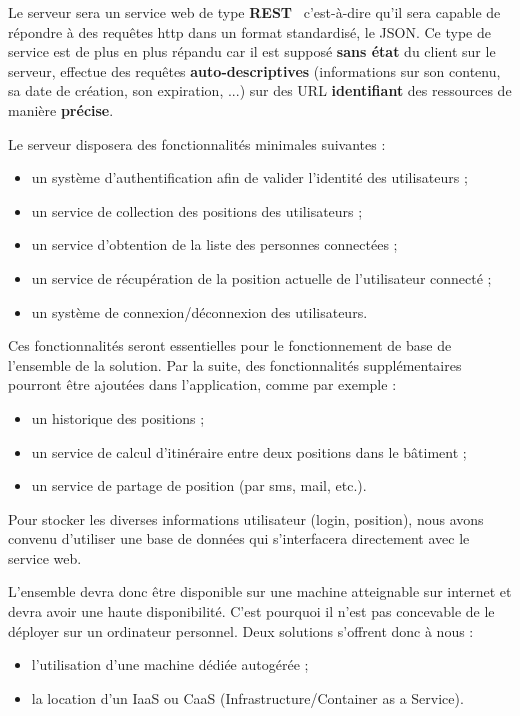 Le serveur sera un service web de type \textbf{REST}~\cite{rest} c’est-à-dire qu’il sera capable de répondre à des requêtes http dans un format standardisé, le JSON. Ce type de service est de plus en plus répandu car il est supposé \textbf{sans état} du client sur le serveur, effectue des requêtes \textbf{auto-descriptives} (informations sur son contenu, sa date de création, son expiration, ...) sur des URL \textbf{identifiant} des ressources de manière \textbf{précise}.

Le serveur disposera des fonctionnalités minimales suivantes :

\begin{itemize}
    \item un système d’authentification afin de valider l’identité des utilisateurs ;
    \item un service de collection des positions des utilisateurs ;
    \item un service d’obtention de la liste des personnes connectées ;
    \item un service de récupération de la position actuelle de l'utilisateur connecté ;
    \item un système de connexion/déconnexion des utilisateurs.
\end{itemize}

Ces fonctionnalités seront essentielles pour le fonctionnement de base de l'ensemble de la solution. Par la suite, des fonctionnalités supplémentaires pourront être ajoutées dans l'application, comme par exemple :

\begin{itemize}
    \item un historique des positions ;
    \item un service de calcul d'itinéraire entre deux positions dans le bâtiment ;
    \item un service de partage de position (par sms, mail, etc.).
\end{itemize}

Pour stocker les diverses informations utilisateur (login, position), nous avons convenu d'utiliser une base de données qui s'interfacera directement avec le service web.

L’ensemble devra donc être disponible sur une machine atteignable sur internet et devra avoir une haute disponibilité. C’est pourquoi il n’est pas concevable de le déployer sur un ordinateur personnel. Deux solutions s’offrent donc à nous :

\begin{itemize}
    \item l’utilisation d’une machine dédiée autogérée ;
    \item la location d’un IaaS ou CaaS (Infrastructure/Container as a Service).
\end{itemize}

